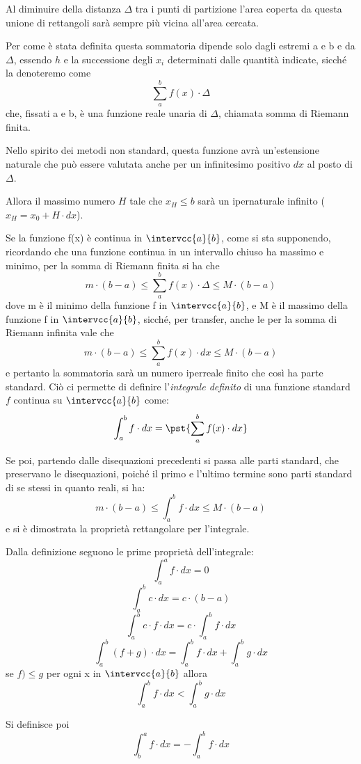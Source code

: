 Al diminuire della distanza \(\Delta\) tra i punti di partizione 
l'area coperta da questa unione di rettangoli sarà sempre più vicina all'area 
cercata.

Per come è stata definita questa sommatoria dipende solo dagli estremi a e b 
e da \(\Delta\), essendo $h$ e la successione degli \(x_i\) determinati dalle 
quantità indicate, sicché la denoteremo come 
\[\sum_a^b f(x) \cdot\Delta\] 
che, fissati a e b, è una 
funzione reale unaria di \(\Delta\), chiamata somma di Riemann finita. 

Nello spirito dei metodi non standard, questa funzione avrà un'estensione 
naturale che può essere valutata anche per un infinitesimo positivo \(dx\) 
al posto di \(\Delta\).

Allora il massimo numero \(H\) tale che \(x_H \le b\) sarà un ipernaturale 
infinito (\(x_H = x_0 + H \cdot dx\)).


Se la funzione f(x) è continua in \(\intervcc{a}{b}\), come si sta 
supponendo, 
ricordando che una funzione continua in un intervallo chiuso ha massimo e 
minimo, per la somma di Riemann finita si ha che 
\[m\cdot(b - a) \le \sum_a^b f(x) \cdot\Delta \le M\cdot(b - a)\] 
dove m è il minimo della funzione f in \(\intervcc{a}{b}\), e 
M è il massimo della funzione f in \(\intervcc{a}{b}\), sicché, per transfer, 
anche le per 
la somma di Riemann infinita vale che 
\[m \cdot (b - a) \le  \sum_a^b f(x) \cdot dx  \le M\cdot(b - a)\]
e pertanto la sommatoria sarà un numero iperreale finito che così ha parte 
standard. 
Ciò ci permette di definire l'\emph{integrale definito} di una funzione 
standard \(f\) continua su \(\intervcc{a}{b}\) come:
\[\int_a^b f \cdot dx = \pst{\sum_a^b f(x) \cdot dx}\]

Se poi, 
partendo dalle disequazioni precedenti si passa alle parti standard, che 
preservano le disequazioni, poiché il primo e l'ultimo termine sono parti 
standard di se stessi in quanto reali, si ha: 
\[m \cdot(b - a) \le  \int_a^b f \cdot dx  \le M\cdot(b - a)\] 
e si è dimostrata la proprietà rettangolare per l'integrale.

Dalla definizione seguono le prime proprietà dell'integrale:
\[\int_a^a f \cdot dx=0\] 
\[\int_a^b c \cdot dx = c \cdot (b-a)\] 
\[\int_a^b c \cdot f \cdot dx = c\cdot\int_a^b f \cdot dx\] 
\[\int_a^b (f+g)\cdot dx = 
  \int_a^b f \cdot dx + \int_a^b g\cdot dx\]
se \(f) \le g\) per ogni x in \(\intervcc{a}{b}\) allora 
\[\int_a^b f \cdot dx < \int_a^b g\cdot dx\]

Si definisce poi  
\[\int_b^a f \cdot dx = - \int_a^b f \cdot dx\]

